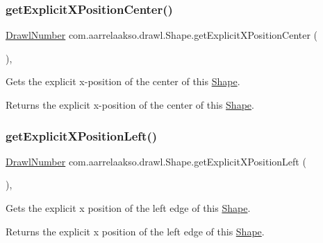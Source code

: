 \subsubsection{\texorpdfstring{get\+Explicit\+X\+Position\+Center()}{getExplicitXPositionCenter()}}
{\footnotesize\ttfamily \hyperlink{classcom_1_1aarrelaakso_1_1drawl_1_1_drawl_number}{Drawl\+Number} com.\+aarrelaakso.\+drawl.\+Shape.\+get\+Explicit\+X\+Position\+Center (\begin{DoxyParamCaption}{ }\end{DoxyParamCaption})\hspace{0.3cm}{\ttfamily [protected]}, {\ttfamily [inherited]}}



Gets the explicit x-\/position of the center of this \hyperlink{classcom_1_1aarrelaakso_1_1drawl_1_1_shape}{Shape}. 

\begin{DoxyReturn}{Returns}
the explicit x-\/position of the center of this \hyperlink{classcom_1_1aarrelaakso_1_1drawl_1_1_shape}{Shape}. 
\end{DoxyReturn}
\mbox{\label{classcom_1_1aarrelaakso_1_1drawl_1_1_shape_a339cf8811f57b7cb5251109b04be953c}} 
\subsubsection{\texorpdfstring{get\+Explicit\+X\+Position\+Left()}{getExplicitXPositionLeft()}}
{\footnotesize\ttfamily \hyperlink{classcom_1_1aarrelaakso_1_1drawl_1_1_drawl_number}{Drawl\+Number} com.\+aarrelaakso.\+drawl.\+Shape.\+get\+Explicit\+X\+Position\+Left (\begin{DoxyParamCaption}{ }\end{DoxyParamCaption})\hspace{0.3cm}{\ttfamily [protected]}, {\ttfamily [inherited]}}



Gets the explicit x position of the left edge of this \hyperlink{classcom_1_1aarrelaakso_1_1drawl_1_1_shape}{Shape}. 

\begin{DoxyReturn}{Returns}
the explicit x position of the left edge of this \hyperlink{classcom_1_1aarrelaakso_1_1drawl_1_1_shape}{Shape}. 
\end{DoxyReturn}
\mbox{\label{classcom_1_1aarrelaakso_1_1drawl_1_1_shape_a19970b658b55e4e61de31aaaef8cf7fe}} 
